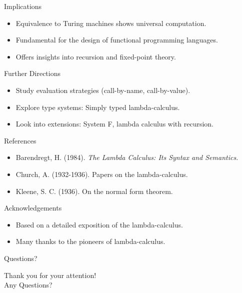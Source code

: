 \documentclass{beamer}
\begin{document}
\begin{frame}{Implications}
  \begin{itemize}
    \item Equivalence to Turing machines shows universal computation.
    \item Fundamental for the design of functional programming languages.
    \item Offers insights into recursion and fixed-point theory.
  \end{itemize}
\end{frame}

\begin{frame}{Further Directions}
  \begin{itemize}
    \item Study evaluation strategies (call-by-name, call-by-value).
    \item Explore type systems: Simply typed lambda-calculus.
    \item Look into extensions: System F, lambda calculus with recursion.
  \end{itemize}
\end{frame}

\begin{frame}{References}
  \begin{itemize}
    \item Barendregt, H. (1984). \textit{The Lambda Calculus: Its Syntax and Semantics.}
    \item Church, A. (1932-1936). Papers on the lambda-calculus.
    \item Kleene, S. C. (1936). On the normal form theorem.
  \end{itemize}
\end{frame}

\begin{frame}{Acknowledgements}
  \begin{itemize}
    \item Based on a detailed exposition of the lambda-calculus.
    \item Many thanks to the pioneers of lambda-calculus.
  \end{itemize}
\end{frame}

\begin{frame}{Questions?}
  \begin{center}
    \Large Thank you for your attention!\\[1em]
    Any Questions?
  \end{center}
\end{frame}

\end{document}
